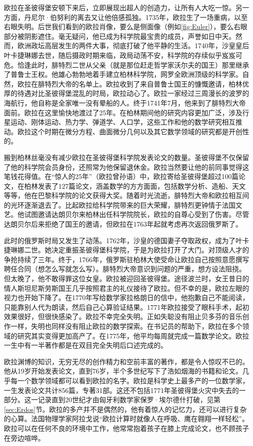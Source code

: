 \documentclass[b5paper]{ctexart}
\begin{document}
\begin{mdframed}
欧拉在圣彼得堡安顿下来后，立即展现出超人的创造力，让所有人大吃一惊。另一方面，丹尼尔·伯努利的离去又让他倍感孤独。1735年，欧拉生了一场重病，以至右眼失明。后世我们看到的欧拉肖像，要么是侧面像（例如\cref{fig:Euler}），要么右眼部分被阴影遮住。毫无疑问，他已成为科学院最宝贵的成员，声誉如日中天。然而，欧洲政坛高层发生的两件大事，彻底打破了他平静的生活。1740年，沙皇皇后叶卡捷琳娜去世，随后摄政时期来临，政局动荡不安，科学院的存续似乎岌岌可危。恰逢此时，腓特烈二世从父亲（就是那位赶走哲学家沃尔夫的国王）那里继承了普鲁士王权\footnotemark。他雄心勃勃地着手建立柏林科学院，网罗全欧洲顶级的科学家。自然，欧拉在腓特烈大帝的名单上。欧拉收到了来自普鲁士国王的慷慨邀请，柏林优厚的待遇对比圣彼得堡混乱的时局，欧拉动心了。欧拉一家经过三周漫长的波罗的海航行，他自称是全家唯一没有晕船的人。终于1741年7月，他来到了腓特烈大帝面前。欧拉在这里愉快地渡过了25年。在柏林期间他的研究内容更加广泛，涉及行星运动、刚体运动、热力学、弹道学、人口学，这些工作和他的数学研究相互推动。欧拉这个时期在微分方程、曲面微分几何以及其它数学领域的研究都是开创性的。

搬到柏林丝毫没有减少欧拉在圣彼得堡科学院发表论文的数量。圣彼得堡不仅保留了他的科学院会员身份，还照常为他保留退休金。欧拉当然要让他的前同事觉得这笔钱花得值。在“惊人的25年”（欧拉曾孙语）中，欧拉寄给圣彼得堡超过100篇论文，在柏林发表了127篇论文，涵盖数学的方方面面，包括数学分析、造船、天文等等，他在巴黎科学院的论文获得大奖。随着时光流逝，腓特烈大帝和欧拉相互间的光环逐渐退去了。比起欧拉给科学院带来的巨大荣耀，腓特烈更钟情于法国文艺。他试图邀请达朗贝尔来柏林出任科学院院长，欧拉的自尊心受到了伤害。尽管达朗贝尔后来拒绝了国王的邀请，但欧拉在1763年起就考虑再次返回俄罗斯了。

此时的俄罗斯时局又发生了动荡。1762年，沙皇的德国妻子夺取政权，成为了叶卡捷琳娜二世。她决定重振圣彼得堡科学院，于是为欧拉打开了大门。对顶级人才的争抢持续了三年。终于，1766年，俄罗斯驻柏林大使受命让欧拉自己按照意愿撰写聘任合同（想怎么写就怎么写）。腓特烈大帝意识到问题的严重，想方设法阻挠。但太晚了，他不敢得罪这位女皇。欧拉被迎回圣彼得堡。途径波兰时，女王昔日的情人斯坦尼斯劳斯国王几乎按照君主的礼仪接待了欧拉。但不幸的是，欧拉左眼的视力也开始下降了。在1770年写给数学家拉格朗日的信中，他抱歉自己不能阅读，只能靠别人代为朗读，然后自己心算验证结果。1771年欧拉接受了眼科手术，起初效果很好，但很快感染了。欧拉不幸完全失明\cite{Weil-1983}。正如失聪没有阻止贝多芬的音乐创作一样，失明也同样没有阻止欧拉的数学探索\cite{HanXueTao2009}。在书记员的帮助下，欧拉在多个领域的研究其实变得更加高产了。在1775年，他平均每周就完成一篇数学论文。欧拉一生中有一半著作都是在双目完全失明后口述完成的。

欧拉渊博的知识，无穷无尽的创作精力和空前丰富的著作，都是令人惊叹不已的。他从19岁开始发表论文，直到76岁，半个多世纪写下了浩如烟海的书籍和论文。几乎每一个数学领域都可以看到欧拉的名字。欧拉是科学史上最多产的一位数学家，一生发表论文共计856篇，专著31部。这还不包括1771年圣彼得堡火灾中失去的一部分。这一记录直到20世纪才由匈牙利数学家保罗·埃尔德什打破，见第\ref{sec:Erdos}节。欧拉的多产并不是偶然的，他有着惊人的记忆力，还可以进行复杂的心算。法国物理学家阿拉戈说“欧拉计算时就像人在呼吸、鹰在翱翔一样轻松”。欧拉可以在任何不良的环境中工作，他常常抱着孩子在膝上完成论文，也不顾孩子在旁边喧哗。


\end{mdframed}
\end{document}
